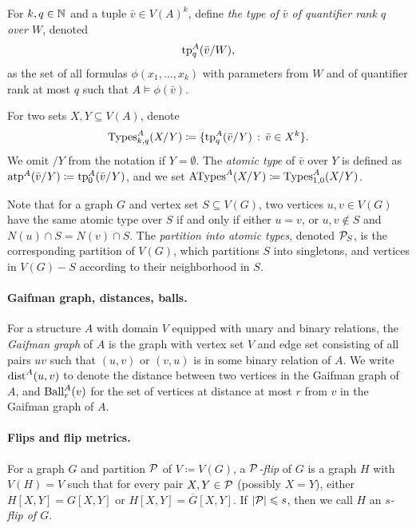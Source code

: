 For $k,q\in\mathbb N$
and a tuple $\bar v\in V(A)^k$, 
define
\emph{the type of $\bar v$ of quantifier rank $q$ over $W$}, denoted
$$\textnormal{tp}^A_q(\bar v/W),$$ as the set of all formulas $\phi(x_1,\ldots,x_k)$ with parameters from $W$ and of quantifier rank at most $q$ such that 
$A\models \phi(\bar v)$.
 

For two sets $X,Y\subseteq V(A)$,
denote $$\operatorname{Types}^A_{k,q}(X/Y)\coloneqq \{\textnormal{tp}^A_q(\bar v/Y) \,:\, \bar v\in X^k \}.$$ 
We omit $/Y$ from the notation if $Y=\emptyset$.
The \emph{atomic type} of $\bar v$ over $Y$ is defined as $\textnormal{atp}^A(\bar v/Y) \coloneqq \textnormal{tp}_0^A(\bar v/Y)$, and we set $\mathrm{ATypes}^A(X/Y)\coloneqq \operatorname{Types}^A_{1,0}(X/Y)$.

Note that for a graph $G$ and vertex set $S\subseteq V(G)$, two vertices $u,v\in V(G)$ have the same atomic type over $S$ if and only if either $u=v$, or $u,v\notin S$ 
and $N(u)\cap S=N(v)\cap S$. 
The \emph{partition into atomic types}, denoted $\mathcal P_S$, is the corresponding partition of 
$V(G)$, which partitions $S$ into singletons, and vertices in $V(G)-S$ according to their neighborhood in $S$.


\paragraph{Gaifman graph, distances, balls.}
For a structure $A$ with domain $V$ equipped with unary and binary relations, the \emph{Gaifman graph} of $A$ is the graph 
with vertex set $V$ and edge set consisting of all pairs $uv$ such that 
$(u,v)$ or $(v,u)$ is in some binary relation of $A$.
We write $\mathrm{dist}^A(u,v)$ to denote the distance between two vertices in the Gaifman graph of $A$, and $\operatorname{Ball}^A_r(v)$  for the set of vertices at distance at most $r$ from $v$ in the Gaifman graph of $A$.


\paragraph{Flips and flip metrics.}
For a graph $G$ and partition $\mathcal P$ of $V\coloneqq V(G)$, a \emph{$\mathcal P$-flip} of $G$ is a graph $H$ with $V(H)=V$ such that for every pair $X,Y\in \mathcal P$ 
(possibly $X=Y$), either 
$H[X,Y]=G[X,Y]$ or $H[X,Y]=\overline G[X,Y]$.
If $|\mathcal P| \leqslant s$, then we call $H$ an \emph{$s$-flip of $G$}. 

